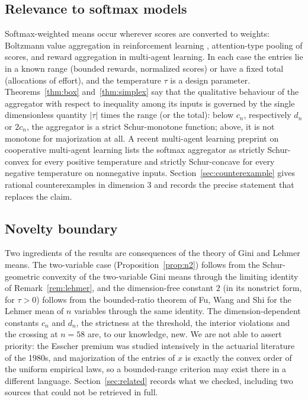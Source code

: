\documentclass[11pt,a4paper]{article}
\theoremstyle{plain}
\theoremstyle{definition}
\begin{document}
\subsection*{Relevance to softmax models}
Softmax-weighted means occur wherever scores are converted to weights: Boltzmann value aggregation in reinforcement learning \cite{AsadiLittman2017}, attention-type pooling of scores, and reward aggregation in multi-agent learning. In each case the entries lie in a known range (bounded rewards, normalized scores) or have a fixed total (allocations of effort), and the temperature $\tau$ is a design parameter. Theorems~\ref{thm:box} and~\ref{thm:simplex} say that the qualitative behaviour of the aggregator with respect to inequality among its inputs is governed by the single dimensionless quantity $|\tau|$ times the range (or the total): below $c_n$, respectively $d_n$ or $2c_n$, the aggregator is a strict Schur-monotone function; above, it is not monotone for majorization at all. A recent multi-agent learning preprint on cooperative multi-agent learning \cite{AmirBettiniProrok2026} lists the softmax aggregator as strictly Schur-convex for every positive temperature and strictly Schur-concave for every negative temperature on nonnegative inputs. Section~\ref{sec:counterexample} gives rational counterexamples in dimension $3$ and records the precise statement that replaces the claim.

\subsection*{Novelty boundary}
Two ingredients of the results are consequences of the theory of Gini and Lehmer means. The two-variable case (Proposition~\ref{prop:n2}) follows from the Schur-geometric convexity of the two-variable Gini means \cite{ShiJiangJiang2009,Witkowski2011} through the limiting identity of Remark~\ref{rem:lehmer}, and the dimension-free constant $2$ (in its nonstrict form, for $\tau>0$) follows from the bounded-ratio theorem of Fu, Wang and Shi for the Lehmer mean of $n$ variables \cite[Theorem~1.4(II)]{FuWangShi2016} through the same identity. The dimension-dependent constants $c_n$ and $d_n$, the strictness at the threshold, the interior violations and the crossing at $n=58$ are, to our knowledge, new. We are not able to assert priority: the Esscher premium was studied intensively in the actuarial literature of the 1980s, and majorization of the entries of $x$ is exactly the convex order of the uniform empirical laws, so a bounded-range criterion may exist there in a different language. Section~\ref{sec:related} records what we checked, including two sources that could not be retrieved in full.
\end{document}
